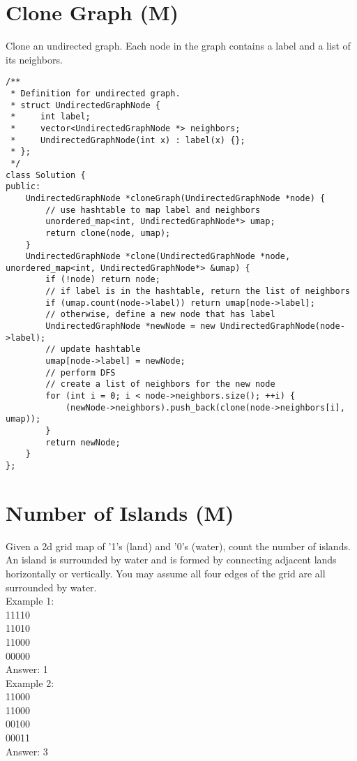 \section{Clone Graph (M)}
Clone an undirected graph. Each node in the graph contains a label and a list of its neighbors. \\

\begin{lstlisting}
/**
 * Definition for undirected graph.
 * struct UndirectedGraphNode {
 *     int label;
 *     vector<UndirectedGraphNode *> neighbors;
 *     UndirectedGraphNode(int x) : label(x) {};
 * };
 */
class Solution {
public:
    UndirectedGraphNode *cloneGraph(UndirectedGraphNode *node) {
        // use hashtable to map label and neighbors
        unordered_map<int, UndirectedGraphNode*> umap;
        return clone(node, umap);
    }
    UndirectedGraphNode *clone(UndirectedGraphNode *node, unordered_map<int, UndirectedGraphNode*> &umap) {
        if (!node) return node;
        // if label is in the hashtable, return the list of neighbors
        if (umap.count(node->label)) return umap[node->label];
        // otherwise, define a new node that has label
        UndirectedGraphNode *newNode = new UndirectedGraphNode(node->label);
        // update hashtable
        umap[node->label] = newNode;
        // perform DFS
        // create a list of neighbors for the new node
        for (int i = 0; i < node->neighbors.size(); ++i) {
            (newNode->neighbors).push_back(clone(node->neighbors[i], umap));
        }
        return newNode;
    } 
};
\end{lstlisting}


\section{Number of Islands (M)}
Given a 2d grid map of '1's (land) and '0's (water), count the number of islands. An island is surrounded by water and is formed by connecting adjacent lands horizontally or vertically. You may assume all four edges of the grid are all surrounded by water.\\

Example 1:\\
11110\\
11010\\
11000\\
00000\\
Answer: 1\\

Example 2:\\
11000\\
11000\\
00100\\
00011\\
Answer: 3\\

